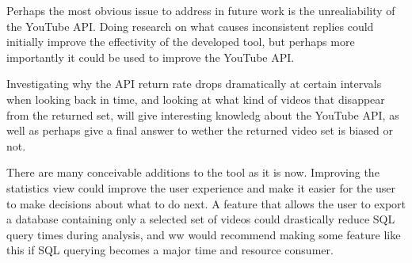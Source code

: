 Perhaps the most obvious issue to address in future work is the unrealiability
of the YouTube API. Doing research on what causes inconsistent replies could
initially improve the effectivity of the developed tool, but perhaps more 
importantly it could be used to improve the YouTube API. 

Investigating why the API return rate drops dramatically at certain intervals
when looking back in time, and looking at what kind of videos that disappear
from the returned set, will give interesting knowledg about the YouTube API,
as well as perhaps give a final answer to wether the returned video set is
biased or not.

There are many conceivable additions to the tool as it is now. Improving the
statistics view could improve the user experience and make it easier for the
user to make decisions about what to do next. A feature that allows the user to
export a database containing only a selected set of videos could drastically
reduce SQL query times during analysis, and ww would recommend making some
feature like this if SQL querying becomes a major time and resource consumer.

